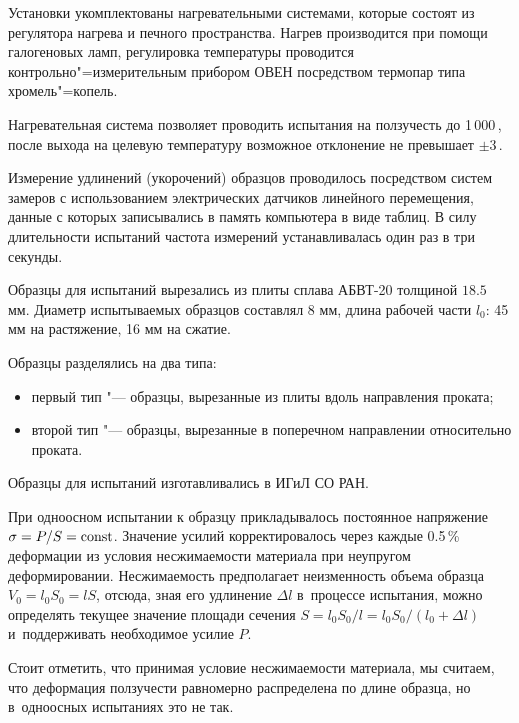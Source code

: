 Установки  укомплектованы нагревательными системами, которые состоят из регулятора нагрева и печного пространства. Нагрев производится при помощи галогеновых ламп, регулировка температуры проводится контрольно"=измерительным прибором ОВЕН посредством термопар типа хромель"=копель. 

Нагревательная система позволяет проводить испытания на ползучесть до 1\,000\,\textcelsius, после выхода на целевую температуру возможное отклонение не превышает $\pm3$\,\textcelsius. 



Измерение удлинений (укорочений) образцов проводилось посредством систем замеров с использованием электрических датчиков линейного перемещения, данные с которых записывались в память компьютера в виде таблиц. В силу длительности испытаний частота измерений устанавливалась один раз в три секунды.



Образцы для испытаний вырезались из плиты сплава АБВТ-20 толщиной $18.5$ мм. Диаметр испытываемых образцов составлял 8 мм, длина рабочей части $l_{0}$:  45 мм на растяжение, 16 мм на сжатие.   

Образцы разделялись на два типа: 

\begin{itemize}

\item[--] первый тип "--- образцы, вырезанные из плиты вдоль направления проката; 

\item[--] второй тип "--- образцы, вырезанные в поперечном направлении относительно проката.

\end{itemize} Образцы для испытаний изготавливались в ИГиЛ СО РАН.



При одноосном испытании к образцу прикладывалось постоянное напряжение $\sigma = P/S ={\rm const}$. Значение усилий корректировалось через каждые 0.5\,\% деформации из условия несжимаемости материала при неупругом деформировании. Несжимаемость предполагает неизменность объема образца $V_{0}=l_{0}S_{0}= l S$, отсюда, зная его удлинение $\Delta l$ в~процессе испытания, можно определять текущее значение площади сечения $S=l_{0}S_{0}/l=l_{0}S_{0}/(l_{0}+\Delta l)$ и~поддерживать необходимое усилие $P$. 

Стоит отметить, что принимая условие несжимаемости материала, мы считаем, что деформация ползучести равномерно распределена по длине образца, но в~одноосных испытаниях это не так. 

